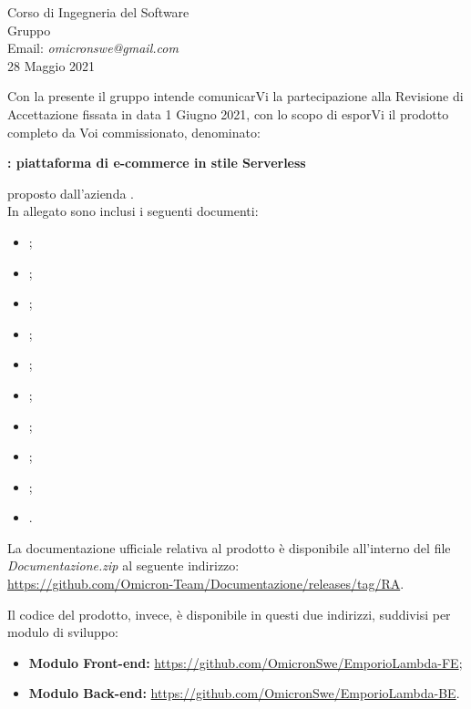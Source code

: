 \documentclass[12pt,a4paper]{letter}
\begin{document}
\begin{letter}
{\begin{flushleft}
			\vspace{1cm}
            Corso di Ingegneria del Software\\ Gruppo \Omicron{}\\ Email:  \textit{omicronswe@gmail.com} \\ 28 Maggio 2021 
        \end{flushleft}
        }
        \opening{ Con la presente il gruppo \Omicron{} intende comunicarVi la partecipazione alla Revisione di Accettazione fissata in data 1 Giugno 2021, con lo scopo di esporVi il prodotto completo da Voi commissionato, denominato:}
        \begin{center}
           \textbf{\nameproject{} : piattaforma di e-commerce in stile Serverless} 
        \end{center}
        proposto dall'azienda \textit{\Proponente{}}.\\
        In allegato sono inclusi i seguenti documenti:
            \begin{itemize}
                \item {};
                \item {};
                \item {};
                \item {};
                \item {};
                \item {};
                \item {};
                \item {};
                \item {};
                \item {}.
            \end{itemize}
            
            
La documentazione ufficiale relativa al prodotto è disponibile all'interno del file \textit{Documentazione.zip} al seguente indirizzo:\\ \url{https://github.com/Omicron-Team/Documentazione/releases/tag/RA}.

Il codice del prodotto, invece, è disponibile in questi due indirizzi, suddivisi per modulo di sviluppo:
\begin{itemize}
	\item \textbf{Modulo Front-end:} \url{https://github.com/OmicronSwe/EmporioLambda-FE};
	\item \textbf{Modulo Back-end:} \url{https://github.com/OmicronSwe/EmporioLambda-BE}.
\end{itemize}
        

\end{letter}
\end{document}

